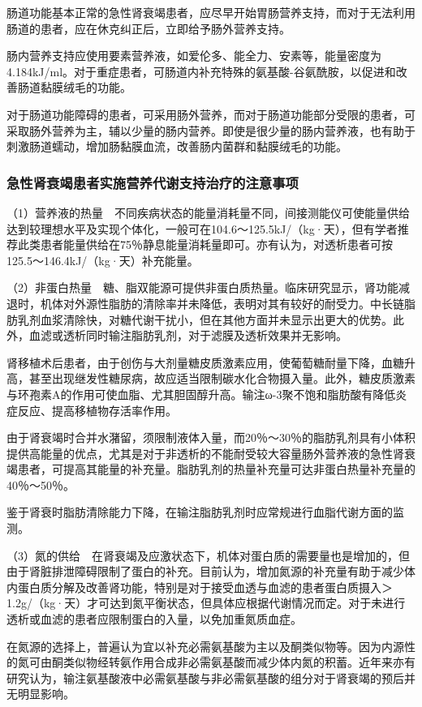 肠道功能基本正常的急性肾衰竭患者，应尽早开始胃肠营养支持，而对于无法利用肠道的患者，应在休克纠正后，立即给予肠外营养支持。

肠内营养支持应使用要素营养液，如爱伦多、能全力、安素等，能量密度为4.184kJ/ml。对于重症患者，可肠道内补充特殊的氨基酸-谷氨酰胺，以促进和改善肠道黏膜绒毛的功能。

对于肠道功能障碍的患者，可采用肠外营养，而对于肠道功能部分受限的患者，可采取肠外营养为主，辅以少量的肠内营养。即使是很少量的肠内营养液，也有助于刺激肠道蠕动，增加肠黏膜血流，改善肠内菌群和黏膜绒毛的功能。

\subsubsection{急性肾衰竭患者实施营养代谢支持治疗的注意事项}

（1）营养液的热量　不同疾病状态的能量消耗量不同，间接测能仪可使能量供给达到较理想水平及实现个体化，一般可在104.6～125.5kJ/（kg·天），但有学者推荐此类患者能量供给在75％静息能量消耗量即可。亦有认为，对透析患者可按125.5～146.4kJ/（kg·天）补充能量。

（2）非蛋白热量　糖、脂双能源可提供非蛋白质热量。临床研究显示，肾功能减退时，机体对外源性脂肪的清除率并未降低，表明对其有较好的耐受力。中长链脂肪乳剂血浆清除快，对糖代谢干扰小，但在其他方面并未显示出更大的优势。此外，血滤或透析同时输注脂肪乳剂，对于滤膜及透析效果并无影响。

肾移植术后患者，由于创伤与大剂量糖皮质激素应用，使葡萄糖耐量下降，血糖升高，甚至出现继发性糖尿病，故应适当限制碳水化合物摄入量。此外，糖皮质激素与环孢素A的作用可使血脂、尤其胆固醇升高。输注ω-3聚不饱和脂肪酸有降低炎症反应、提高移植物存活率作用。

由于肾衰竭时合并水潴留，须限制液体入量，而20％～30％的脂肪乳剂具有小体积提供高能量的优点，尤其是对于非透析的不能耐受较大容量肠外营养液的急性肾衰竭患者，可提高其能量的补充量。脂肪乳剂的热量补充量可达非蛋白热量补充量的40％～50％。

鉴于肾衰时脂肪清除能力下降，在输注脂肪乳剂时应常规进行血脂代谢方面的监测。

（3）氮的供给　在肾衰竭及应激状态下，机体对蛋白质的需要量也是增加的，但由于肾脏排泄障碍限制了蛋白的补充。目前认为，增加氮源的补充量有助于减少体内蛋白质分解及改善肾功能，特别是对于接受血透与血滤的患者蛋白质摄入＞1.2g/（kg·天）才可达到氮平衡状态，但具体应根据代谢情况而定。对于未进行透析或血滤的患者应限制蛋白的入量，以免加重氮质血症。

在氮源的选择上，普遍认为宜以补充必需氨基酸为主以及酮类似物等。因为内源性的氮可由酮类似物经转氨作用合成非必需氨基酸而减少体内氮的积蓄。近年来亦有研究认为，输注氨基酸液中必需氨基酸与非必需氨基酸的组分对于肾衰竭的预后并无明显影响。

